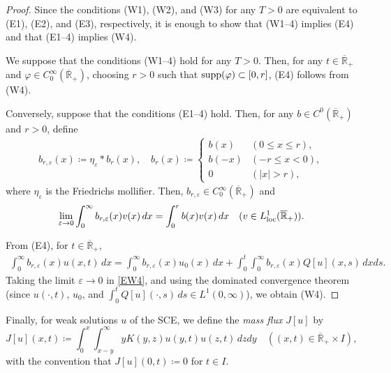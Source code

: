 \documentclass[a4paper,11pt]{article}
\def\Rb{\overline{{\mathbb R}}_+}
\def\supp{\mbox{\rm supp}}
\begin{document}
\begin{proof}
Since the conditions (W1), (W2), and (W3) for any $T>0$ are
equivalent to (E1), (E2), and (E3), respectively,
it is enough to show that (W1–4) implies (E4) and that
(E1–4) implies (W4).

We suppose that the conditions (W1–4) hold for any $T>0$.
Then, for any $t\in\Rb$ and $\varphi\in C^\infty_0(\Rb)$,
choosing $r>0$ such that $\supp(\varphi)\subset [0,r]$,
(E4) follows from (W4).

Conversely, suppose that the conditions (E1–4) hold.
Then, for any $b\in C^0(\Rb)$ and $r>0$,
define
\begin{align*}
b_{r,\varepsilon}(x)\coloneqq\eta_\varepsilon * b_r(x),\quad
b_r(x)\coloneqq
\begin{cases}
  b(x) & (0\leq x \leq r),\\
  b(-x) & (-r\leq x < 0), \\
  0 & (|x|>r),
\end{cases}
\end{align*}
where $\eta_\varepsilon$ is the Friedrichs mollifier.
Then, $b_{r,\varepsilon} \in C^\infty_0(\Rb)$ and
\begin{align*}
  \lim_{\varepsilon\to 0}
  \int_0^\infty b_{r,\varepsilon}(x) v(x)\,dx =\int_0^r b(x)v(x)\,dx
  \quad (v\in L^1_{\rm loc}(\Rb)).
\end{align*}

From (E4), for $t\in\Rb$,
\begin{align}\label{EW4}
  \int_{0}^{\infty}b_{r,\varepsilon}(x)u(x,t)\,dx
  =\int_{0}^{\infty}b_{r,\varepsilon}(x)u_0(x)\,dx
  +\int_{0}^{t}\int_{0}^{\infty}b_{r,\varepsilon}(x)Q[u](x,s)\,dxds.
\end{align}
Taking the limit $\varepsilon\to 0$ in \eqref{EW4}, and using the dominated convergence theorem (since $u(\cdot,t)$, $u_0$, and $\int_{0}^{t}Q[u](\cdot,s)\,ds\in L^1(0,\infty)$), we obtain (W4).
\end{proof}

Finally, for weak solutions $u$ of the SCE, we define the \emph{mass flux} $J[u]$ by
\begin{equation} \label{flux}
  J[u](x,t) \coloneqq \int^x_0 \int^\infty _{x-y} yK(y,z)u(y,t)u(z,t) \, dzdy
  \quad((x,t)\in\Rb \times I),
\end{equation}
with the convention that $J[u](0,t) \coloneqq 0$ for $t\in I$.
\end{document}
